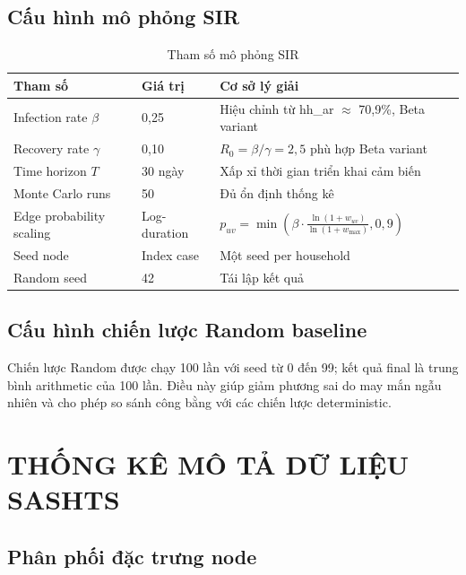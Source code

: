 \documentclass[12pt,a4paper]{report}
\theoremstyle{definition}
\begin{document}
\section{Cấu hình mô phỏng SIR}

\begin{table}[H]
\centering
\caption{Tham số mô phỏng SIR}
\label{tab:sir_params}
\begin{tabular}{L{5.5cm} C{3cm} L{6cm}}
\toprule
\textbf{Tham số} & \textbf{Giá trị} & \textbf{Cơ sở lý giải}\\
\midrule
Infection rate $\beta$    & 0,25     & Hiệu chỉnh từ hh\_ar $\approx$ 70,9\%, Beta variant\\
Recovery rate $\gamma$    & 0,10     & $R_0 = \beta/\gamma = 2{,}5$ phù hợp Beta variant\\
Time horizon $T$          & 30 ngày  & Xấp xỉ thời gian triển khai cảm biến\\
Monte Carlo runs          & 50       & Đủ ổn định thống kê\\
Edge probability scaling  & Log-duration & $p_{uv} = \min(\beta \cdot \frac{\ln(1+w_{uv})}{\ln(1+w_{\max})}, 0{,}9)$\\
Seed node                 & Index case & Một seed per household\\
Random seed               & 42       & Tái lập kết quả\\
\bottomrule
\end{tabular}
\end{table}

\section{Cấu hình chiến lược Random baseline}

Chiến lược Random được chạy 100 lần với seed từ 0 đến 99; kết quả final là trung bình arithmetic của 100 lần. Điều này giúp giảm phương sai do may mắn ngẫu nhiên và cho phép so sánh công bằng với các chiến lược deterministic.


\chapter{THỐNG KÊ MÔ TẢ DỮ LIỆU SASHTS}
\label{appendix:eda}

\section{Phân phối đặc trưng node}
\end{document}
